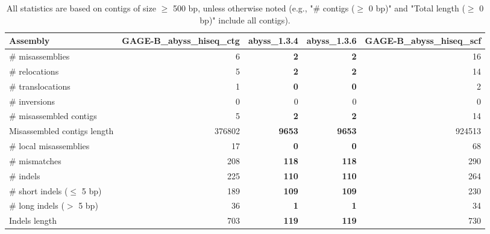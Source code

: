 \documentclass[12pt,a4paper]{article}
\begin{document}
\begin{table}[ht]
\begin{center}
\caption{All statistics are based on contigs of size $\geq$ 500 bp, unless otherwise noted (e.g., "\# contigs ($\geq$ 0 bp)" and "Total length ($\geq$ 0 bp)" include all contigs).}
\begin{tabular}{|l*{4}{|r}|}
\hline
Assembly & GAGE-B\_abyss\_hiseq\_ctg & abyss\_1.3.4 & abyss\_1.3.6 & GAGE-B\_abyss\_hiseq\_scf \\ \hline
\# misassemblies & 6 & {\bf 2} & {\bf 2} & 16 \\ \hline
\hspace{5mm}\# relocations & 5 & {\bf 2} & {\bf 2} & 14 \\ \hline
\hspace{5mm}\# translocations & 1 & {\bf 0} & {\bf 0} & 2 \\ \hline
\hspace{5mm}\# inversions & 0 & 0 & 0 & 0 \\ \hline
\# misassembled contigs & 5 & {\bf 2} & {\bf 2} & 14 \\ \hline
Misassembled contigs length & 376802 & {\bf 9653} & {\bf 9653} & 924513 \\ \hline
\# local misassemblies & 17 & {\bf 0} & {\bf 0} & 68 \\ \hline
\# mismatches & 208 & {\bf 118} & {\bf 118} & 290 \\ \hline
\# indels & 225 & {\bf 110} & {\bf 110} & 264 \\ \hline
\hspace{5mm}\# short indels ($\leq$ 5 bp) & 189 & {\bf 109} & {\bf 109} & 230 \\ \hline
\hspace{5mm}\# long indels ($>$ 5 bp) & 36 & {\bf 1} & {\bf 1} & 34 \\ \hline
Indels length & 703 & {\bf 119} & {\bf 119} & 730 \\ \hline
\end{tabular}
\end{center}
\end{table}
\end{document}
